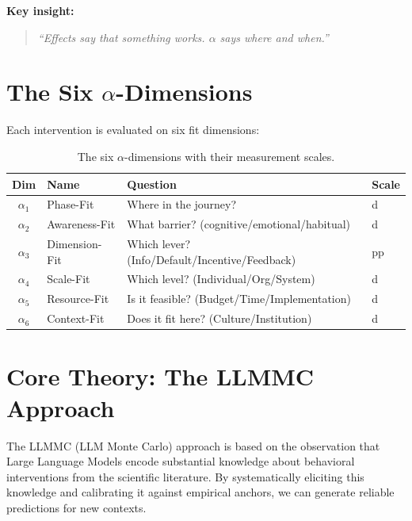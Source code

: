 \textbf{Key insight:}
\begin{quote}
\emph{``Effects say that something works. $\alpha$ says where and when.''}
\end{quote}


\section{The Six $\alpha$-Dimensions}
\label{sec:iii-alpha-dimensions}

Each intervention is evaluated on six fit dimensions:

\begin{table}[h]
\centering
\begin{tabular}{clll}
\toprule
\textbf{Dim} & \textbf{Name} & \textbf{Question} & \textbf{Scale} \\
\midrule
$\alpha_1$ & Phase-Fit & Where in the journey? & d \\
$\alpha_2$ & Awareness-Fit & What barrier? (cognitive/emotional/habitual) & d \\
$\alpha_3$ & Dimension-Fit & Which lever? (Info/Default/Incentive/Feedback) & pp \\
$\alpha_4$ & Scale-Fit & Which level? (Individual/Org/System) & d \\
$\alpha_5$ & Resource-Fit & Is it feasible? (Budget/Time/Implementation) & d \\
$\alpha_6$ & Context-Fit & Does it fit here? (Culture/Institution) & d \\
\bottomrule
\end{tabular}
\caption{The six $\alpha$-dimensions with their measurement scales.}
\label{tab:alpha-dimensions}
\end{table}


\section{Core Theory: The LLMMC Approach}
\label{sec:iii-theory}

The LLMMC (LLM Monte Carlo) approach is based on the observation that Large Language
Models encode substantial knowledge about behavioral interventions from the scientific
literature. By systematically eliciting this knowledge and calibrating it against
empirical anchors, we can generate reliable predictions for new contexts.

